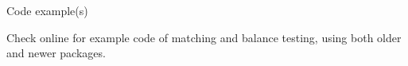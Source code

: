 \documentclass[xcolor=dvipsnames]{beamer}
\newcommand\E{\mathbb{E}}
\newcommand\indep{\protect\mathpalette{\protect\independenT}{\perp}}
\def\independenT#1#2{\mathrel{\rlap{$#1#2$}\mkern2mu{#1#2}}}
\newtheorem{iass}{Identification Assumption}
\newtheorem{ires}{Identfication Result}
\begin{document}
\begin{frame}{Code example(s)}

Check online for example code of matching and balance testing, using both older and newer packages. 

\end{frame}
%
%
%
%
%
\end{document}
